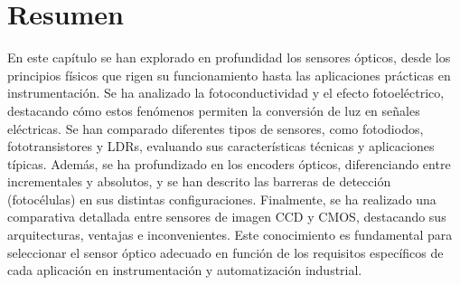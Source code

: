\section{Resumen}\label{sec:resumen}
En este capítulo se han explorado en profundidad los sensores ópticos, desde los principios físicos que rigen su funcionamiento hasta las aplicaciones prácticas en instrumentación. Se ha analizado la fotoconductividad y el efecto fotoeléctrico, destacando cómo estos fenómenos permiten la conversión de luz en señales eléctricas. Se han comparado diferentes tipos de sensores, como fotodiodos, fototransistores y LDRs, evaluando sus características técnicas y aplicaciones típicas. Además, se ha profundizado en los encoders ópticos, diferenciando entre incrementales y absolutos, y se han descrito las barreras de detección (fotocélulas) en sus distintas configuraciones. Finalmente, se ha realizado una comparativa detallada entre sensores de imagen CCD y CMOS, destacando sus arquitecturas, ventajas e inconvenientes. Este conocimiento es fundamental para seleccionar el sensor óptico adecuado en función de los requisitos específicos de cada aplicación en instrumentación y automatización industrial.

\cleardoublepage
